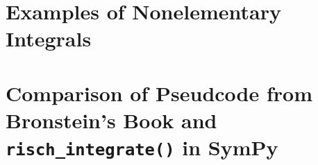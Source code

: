 \documentclass[12pt,titlepage]{article}
\newcommand{\rischintegrate}{\texttt{risch\_integrate()}}
\begin{document}
\appendix

\section{Examples of Nonelementary Integrals}
\label{nonelementary_examples_appendix}


\section{Comparison of Pseudcode from Bronstein's Book
\cite{bronstein2005symbolic} and \rischintegrate{} in SymPy}
\label{comparison}


\glsaddall
\printglossary

\nocite{*}


\end{document}
